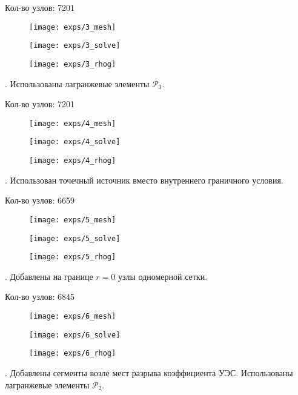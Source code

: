 Кол-во узлов: 7201

\begin{figure}[H]
  \texttt{[image: exps/3\_mesh]}
\end{figure}
\begin{figure}[H]
  \texttt{[image: exps/3\_solve]}
\end{figure}
\begin{figure}[H]
  \texttt{[image: exps/3\_rhog]}
\end{figure}

 \theexp.
Использованы лагранжевые элементы $\mathcal{P}_3$.

Кол-во узлов: 7201

\begin{figure}[H]
  \texttt{[image: exps/4\_mesh]}
\end{figure}
\begin{figure}[H]
  \texttt{[image: exps/4\_solve]}
\end{figure}
\begin{figure}[H]
  \texttt{[image: exps/4\_rhog]}
\end{figure}

 \theexp \label{optimal}.
Использован точечный источник вместо внутреннего граничного условия.

Кол-во узлов: 6659

\begin{figure}[H]
  \texttt{[image: exps/5\_mesh]}
\end{figure}
\begin{figure}[H]
  \texttt{[image: exps/5\_solve]}
\end{figure}
\begin{figure}[H]
  \texttt{[image: exps/5\_rhog]}
\end{figure}

 \theexp.
Добавлены на границе $r = 0$ узлы одномерной сетки.

Кол-во узлов: 6845

\begin{figure}[H]
  \texttt{[image: exps/6\_mesh]}
\end{figure}
\begin{figure}[H]
  \texttt{[image: exps/6\_solve]}
\end{figure}
\begin{figure}[H]
  \texttt{[image: exps/6\_rhog]}
\end{figure}

 \theexp \label{ideal}.
Добавлены сегменты возле мест разрыва коэффициента УЭС. Использованы лагранжевые элементы $\mathcal{P}_2$.

